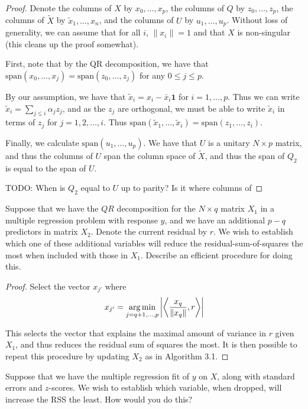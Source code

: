 \begin{proof}
    Denote the columns of $X$ by $x_0, \dots, x_{p}$, the columns of $Q$ by $z_0, \dots, z_p$, the columns of $\tilde X$ by $\tilde x_1, \dots, x_n$, and the columns of $U$ by $u_1, \dots, u_p$.  Without loss of generality, we can assume that for all $i$, $\| x_i \| = 1$ and that $X$ is non-singular (this cleans up the proof somewhat).


    First, note that by the QR decomposition, we have that $\text{span}(x_0, \dots, x_j) = \text{span}(z_0, \dots, z_j)$ for any $0 \leq j \leq p$.  

    By our assumption, we have that $\tilde x_i = x_i - \bar x_i \mathbf{1}$ for $i = 1, \dots, p$.  Thus we can write $\tilde x_i = \sum_{j \leq i} \alpha_j z_j$, and as the $z_j$ are orthogonal, we must be able to write $\tilde x_i$ in terms of $z_j$ for $j = 1, 2, \dots, i$.  Thus $\text{span}(\tilde x_1, \dots, \tilde x_i) = \text{span}(z_1, \dots, z_i)$.  

    Finally, we calculate $\text{span}(u_1, \dots, u_p)$.  We have that $U$ is a unitary $N \times p$ matrix, and thus the columns of $U$ span the column space of $\tilde X$, and thus the span of $Q_2$ is equal to the span of $U$.  

    TODO: When is $Q_2$ equal to $U$ up to parity?  Is it where columns of 
\end{proof}
\begin{exer}
    Suppose that we have the $QR$ decomposition for the $N \times q$ matrix $X_1$ in a multiple regression problem with response $y$, and we have an additional $p - q$ predictors in matrix $X_2$.  Denote the current residual by $r$.  We wish to establish which one of these additional variables will reduce the residual-sum-of-squares the most when included with those in $X_1$.  Describe an efficient procedure for doing this.
\end{exer}

\begin{proof}
    Select the vector $x_{j'}$ where
    \begin{align*}
        x_{j'} = \operatorname*{arg\,min}_{j = q+1, \dots, p} \left| \left\langle \frac{x_q}{\| x_q \|}, r \right\rangle \right| 
    \end{align*}
    
    This selects the vector that explains the maximal amount of variance in $r$ given $X_1$, and thus reduces the residual sum of squares the most.  It is then possible to repeat this procedure by updating $X_2$ as in Algorithm 3.1.
\end{proof}
\begin{exer}
    Suppose that we have the multiple regression fit of $y$ on $X$, along with standard errors and $z$-scores.  We wish to establish which variable, when dropped, will increase the RSS the least.  How would you do this?
\end{exer}

